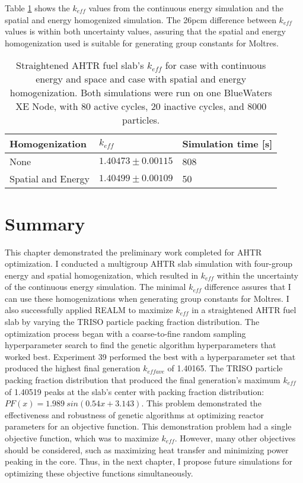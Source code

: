 Table \ref{tab:keff_multigroup} shows the $k_{eff}$ values from the continuous 
energy simulation and the spatial and energy homogenized simulation. 
The 26pcm difference between $k_{eff}$ values is within both uncertainty values, 
assuring that the spatial and energy homogenization used is suitable for generating 
group constants for Moltres. 
\begin{table}[]
    \centering
    \onehalfspacing
    \caption{Straightened \acrfull{AHTR} fuel slab's $k_{eff}$ for case with 
    continuous energy and space and case with spatial and energy homogenization. 
    Both simulations were run on one BlueWaters XE Node, with 80 active cycles, 
    20 inactive cycles, and 8000 particles.}
	\label{tab:keff_multigroup}
    \footnotesize
    \begin{tabular}{lll}
    \hline 
    \textbf{Homogenization}& \textbf{$k_{eff}$} & \textbf{Simulation time [s]}  \\
    \hline 
    None & $1.40473 \pm 0.00115$ & 808\\ 
    Spatial and Energy & $1.40499 \pm 0.00109$ & 50\\ 
    \hline
    \end{tabular}
\end{table}

\section{Summary}
This chapter demonstrated the preliminary work completed for \gls{AHTR} 
optimization. 
I conducted a multigroup \gls{AHTR} slab simulation with four-group energy 
and spatial homogenization, which resulted in $k_{eff}$ within the uncertainty of 
the continuous energy simulation. 
The minimal $k_{eff}$ difference assures that I can use these homogenizations 
when generating group constants for Moltres. 
I also successfully applied \gls{REALM} to maximize $k_{eff}$ in a straightened 
\acrfull{AHTR} fuel slab by varying the \gls{TRISO} particle packing fraction 
distribution. 
The optimization process began with a coarse-to-fine random sampling 
hyperparameter search to find the genetic algorithm hyperparameters that worked 
best. 
Experiment 39 performed the best with a hyperparameter set that produced the 
highest final generation $k_{eff ave}$ of 1.40165. 
The \gls{TRISO} particle packing fraction distribution that produced the final 
generation's maximum $k_{eff}$ of 1.40519 peaks at the slab's center with 
packing fraction distribution: $PF(x)=1.989\ sin(0.54x+3.143)$. 
This problem demonstrated the effectiveness and robustness of genetic algorithms 
at optimizing reactor parameters for an objective function. 
This demonstration problem had a single objective function, which was to maximize 
$k_{eff}$. 
However, many other objectives should be considered, such as maximizing heat 
transfer and minimizing power peaking in the core.
Thus, in the next chapter, I propose future simulations for optimizing
these objective functions simultaneously.
